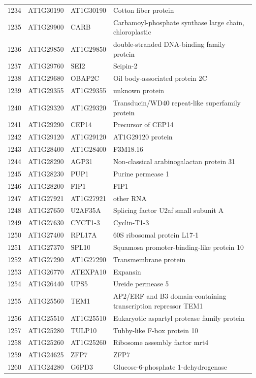 \documentclass[11pt]{article}
\begin{document}
\begin{center}
\begin{tabular}{rlll}
1234 & AT1G30190 & AT1G30190 & Cotton fiber protein\\
1235 & AT1G29900 & CARB & Carbamoyl-phosphate synthase large chain, chloroplastic\\
1236 & AT1G29850 & AT1G29850 & double-stranded DNA-binding family protein\\
1237 & AT1G29760 & SEI2 & Seipin-2\\
1238 & AT1G29680 & OBAP2C & Oil body-associated protein 2C\\
1239 & AT1G29355 & AT1G29355 & unknown protein\\
1240 & AT1G29320 & AT1G29320 & Transducin/WD40 repeat-like superfamily protein\\
1241 & AT1G29290 & CEP14 & Precursor of CEP14\\
1242 & AT1G29120 & AT1G29120 & AT1G29120 protein\\
1243 & AT1G28400 & AT1G28400 & F3M18.16\\
1244 & AT1G28290 & AGP31 & Non-classical arabinogalactan protein 31\\
1245 & AT1G28230 & PUP1 & Purine permease 1\\
1246 & AT1G28200 & FIP1 & FIP1\\
1247 & AT1G27921 & AT1G27921 & other RNA\\
1248 & AT1G27650 & U2AF35A & Splicing factor U2af small subunit A\\
1249 & AT1G27630 & CYCT1-3 & Cyclin-T1-3\\
1250 & AT1G27400 & RPL17A & 60S ribosomal protein L17-1\\
1251 & AT1G27370 & SPL10 & Squamosa promoter-binding-like protein 10\\
1252 & AT1G27290 & AT1G27290 & Transmembrane protein\\
1253 & AT1G26770 & ATEXPA10 & Expansin\\
1254 & AT1G26440 & UPS5 & Ureide permease 5\\
1255 & AT1G25560 & TEM1 & AP2/ERF and B3 domain-containing transcription repressor TEM1\\
1256 & AT1G25510 & AT1G25510 & Eukaryotic aspartyl protease family protein\\
1257 & AT1G25280 & TULP10 & Tubby-like F-box protein 10\\
1258 & AT1G25260 & AT1G25260 & Ribosome assembly factor mrt4\\
1259 & AT1G24625 & ZFP7 & ZFP7\\
1260 & AT1G24280 & G6PD3 & Glucose-6-phosphate 1-dehydrogenase\\

\end{tabular}
\end{center}
\end{document}
